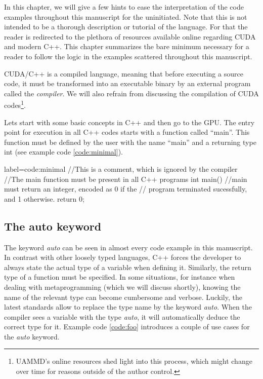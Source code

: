 \documentclass[ twoside,openright,titlepage,numbers=noenddot,%
headinclude,footinclude,cleardoublepage=empty,abstract=on,
BCOR=5mm,paper=a4,fontsize=11pt, dvipsnames
]{scrreprt}
\newcommand{\uammd}{\gls{UAMMD}\xspace}
\newcommand{\gpu}{\gls{GPU}\xspace}
\begin{document}
In this chapter, we will give a few hints to ease the interpretation of the code examples throughout this manuscript for the uninitiated. Note that this is not intended to be a thorough description or tutorial of the language. For that the reader is redirected to the plethora of resources available online regarding CUDA and modern C++. This chapter summarizes the bare minimum necessary for a reader to follow the logic in the examples scattered throughout this manuscript.

CUDA/C++ is a compiled language, meaning that before executing a source code, it must be transformed into an executable binary by an external program called the \emph{compiler}. We will also refrain from discussing the compilation of CUDA codes\footnote{\uammd's online resources shed light into this process, which might change over time for reasons outside of the author control.}.

Lets start with some basic concepts in C++ and then go to the \gpu. The entry point for execution in all C++ codes starts with a function called ``main''. This function must be defined by the user with the name ``main'' and a returning type int (see example code \ref{code:minimal}).

\begin{code2}
{label=code:minimal}
//This is a comment, which is ignored by the compiler
//The main function must be present in all C++ programs
int main(){
  //main must return an integer, encoded as 0 if the
  // program terminated sucessfully, and 1 otherwise.
  return 0;
}
\end{code2}

\subsection*{The auto keyword}
The keyword \emph{auto} can be seen in almost every code example in this manuscript. In contrast with other loosely typed languages, C++ forces the developer to always state the actual type of a variable when defining it. Similarly, the return type of a function must be specified.
In some situations, for instance when dealing with metaprogramming (which we will discuss shortly), knowing the name of the relevant type can become cumbersome and verbose. Luckily, the latest standards allow to replace the type name by the keyword \emph{auto}. When the compiler sees a variable with the type \emph{auto}, it will automatically deduce the correct type for it. Example code \ref{code:foo} introduces a couple of use cases for the \emph{auto} keyword.
\end{document}
